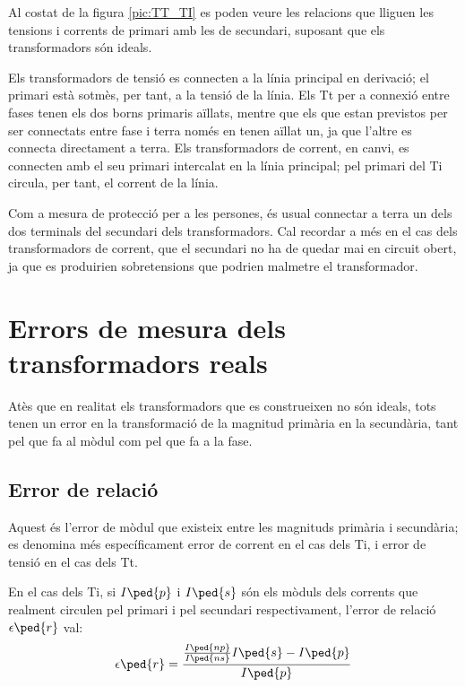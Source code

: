 Al costat de la figura
\vref{pic:TT_TI} es poden veure les relacions que lliguen les
tensions i corrents de primari amb les de secundari, suposant que
els transformadors són ideals.


Els transformadors de tensió es connecten a la línia principal en
derivació; el  primari està sotmès, per tant, a la tensió de la
línia. Els Tt per a connexió entre fases tenen els dos borns
primaris aïllats, mentre que els que estan previstos per ser
connectats entre fase i terra només en tenen aïllat un, ja que
l'altre es connecta directament a terra. Els transformadors de
corrent, en canvi, es connecten amb el seu primari intercalat en la
línia principal;  pel primari del Ti circula, per tant, el corrent
 de la línia.

 Com a mesura de protecció per a les persones, és usual
connectar a terra un dels dos terminals del secundari dels
transformadors. Cal recordar a més en el cas dels transformadors de
corrent, que el secundari no ha de quedar mai en circuit obert, ja
que es produirien sobretensions que podrien malmetre el
transformador.

\section{Errors de mesura dels transformadors reals}

Atès que en realitat els transformadors que es construeixen no són
ideals, tots tenen un error en la transformació de la magnitud
primària en la secundària, tant pel que fa al mòdul com pel que fa
a la fase.

\subsection{Error de relació}

Aquest és l'error de mòdul que existeix entre les magnituds primària i
secundària; es denomina més específicament error de corrent en el
cas dels Ti, i error de tensió en el cas dels Tt.

En el cas dels Ti, si $I\ped{p}$ i $I\ped{s}$ són els mòduls dels corrents que
realment circulen pel primari i pel secundari respectivament,
l'error de relació $\epsilon\ped{r}$ val:
\begin{equation}
    \epsilon\ped{r} = \frac{\frac{I\ped{np}}{I\ped{ns}} I\ped{s} - I\ped{p}} {I\ped{p}}
\end{equation}

